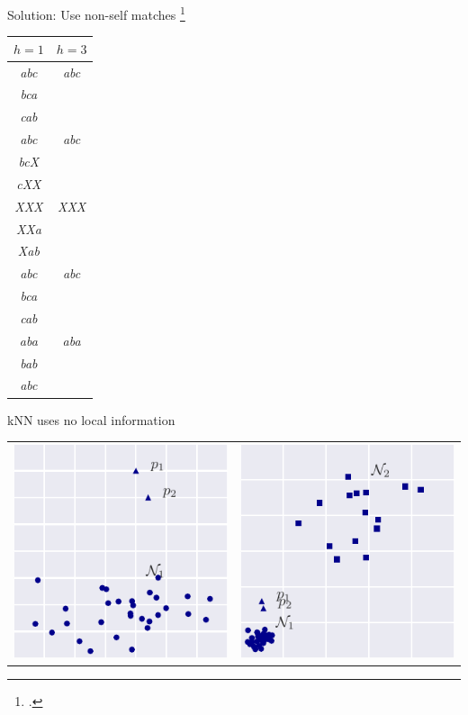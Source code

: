 \documentclass{beamer}
\begin{document}
  \begin{frame}{Solution: Use non-self matches \footcite{Keogh2005}}

    \small
    \centering
    \begin{tabular}{|c||c|}
      \hline
      $h=1$ & $h=3$ \\
      \hline
      \hline
      \emph{abc} & \emph{abc} \\
      \emph{bca} & \\
      \emph{cab} & \\
      \hline
      \emph{abc} & \emph{abc} \\
      \emph{bcX} & \\
      \emph{cXX} & \\
      \hline
      \emph{XXX} & \emph{XXX} \\
      \emph{XXa} & \\
      \emph{Xab} & \\
      \hline
      \emph{abc} & \emph{abc} \\
      \emph{bca} & \\
      \emph{cab} & \\
      \hline
      \emph{aba} & \emph{aba} \\ 
      \emph{bab} & \\
      \emph{abc} & \\
      \hline
    \end{tabular}

  \end{frame}


  \begin{frame}{kNN uses no local information}
    
    \centering
    \begin{tabular}{c|c}
      \includegraphics[width=.45\textwidth]{figs/hard1_dist.pdf} &
      \includegraphics[width=.45\textwidth]{figs/hard2_dist.pdf}
    \end{tabular}

  \end{frame}
\end{document}
